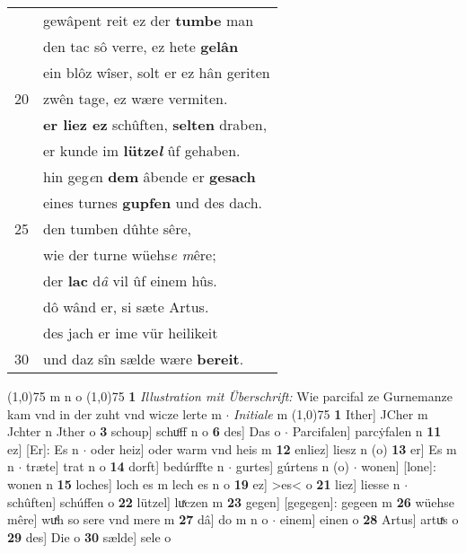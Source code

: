 \documentclass[8pt,a4paper,notitlepage]{article}
\begin{document}
\begin{table}[ht]
\begin{minipage}[t]{0.5\linewidth}
\begin{tabular}{rl}
 & gewâpent reit ez der \textbf{tumbe} man\\ 
 & den tac sô verre, ez hete \textbf{gelân}\\ 
 & ein blôz wîser, solt er ez hân geriten\\ 
20 & zwên tage, ez wære vermiten.\\ 
 & \textbf{er liez ez} schûften, \textbf{selten} draben,\\ 
 & er kunde im \textbf{lütze\textit{l}} ûf gehaben.\\ 
 & hin geg\textit{e}n \textbf{dem} âbende er \textbf{gesach}\\ 
 & eines turnes \textbf{gupfen} und des dach.\\ 
25 & den tumben dûhte sêre,\\ 
 & wie der turne wüehs\textit{e m}êre;\\ 
 & der \textbf{lac} d\textit{â} vil ûf einem hûs.\\ 
 & dô wând er, si sæte Artus.\\ 
 & des jach er ime vür heilikeit\\ 
30 & und daz sîn sælde wære \textbf{bereit}.\\ 
\end{tabular}
\scriptsize
\line(1,0){75} \newline
m n o \newline
\line(1,0){75} \newline
\textbf{1} \textit{Illustration mit Überschrift:} Wie parcifal ze Gurnemanze kam vnd in der zuht vnd wicze lerte m   $\cdot$ \textit{Initiale} m  \newline
\line(1,0){75} \newline
\textbf{1} Ither] JCher m Jchter n Jther o \textbf{3} schoup] schuͦff n o \textbf{6} des] Das o  $\cdot$ Parcifalen] parcẏfalen n \textbf{11} ez] [Er]: Es n  $\cdot$ oder heiz] oder warm vnd heis m \textbf{12} enliez] liesz n (o) \textbf{13} er] Es m n  $\cdot$ træte] trat n o \textbf{14} dorft] bedúrffte n  $\cdot$ gurtes] gúrtens n (o)  $\cdot$ wonen] [lone]: wonen n \textbf{15} loches] loch es m lech es n o \textbf{19} ez] >es< o \textbf{21} liez] liesse n  $\cdot$ schûften] schúffen o \textbf{22} lützel] luͯczen m \textbf{23} gegen] [gegegen]: gegeen m \textbf{26} wüehse mêre] wuͯh so sere vnd mere m \textbf{27} dâ] do m n o  $\cdot$ einem] einen o \textbf{28} Artus] artuͯs o \textbf{29} des] Die o \textbf{30} sælde] sele o \newline
\end{minipage}
\end{table}
\end{document}
